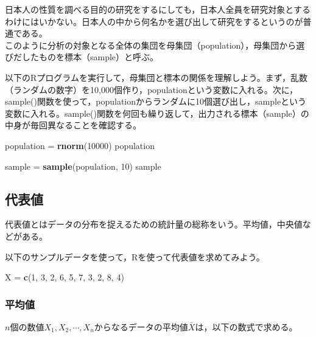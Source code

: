 \documentclass[]{article}
\newenvironment{Shaded}{\begin{snugshade}}{\end{snugshade}}
\newcommand{\KeywordTok}[1]{\textcolor[rgb]{0.13,0.29,0.53}{\textbf{#1}}}
\newcommand{\DecValTok}[1]{\textcolor[rgb]{0.00,0.00,0.81}{#1}}
\newcommand{\StringTok}[1]{\textcolor[rgb]{0.31,0.60,0.02}{#1}}
\newcommand{\NormalTok}[1]{#1}
\begin{document}
日本人の性質を調べる目的の研究をするにしても，日本人全員を研究対象とするわけにはいかない。日本人の中から何名かを選び出して研究をするというのが普通である。\\
このように分析の対象となる全体の集団を母集団（population），母集団から選びだしたものを標本（sample）と呼ぶ。

以下のRプログラムを実行して，母集団と標本の関係を理解しよう。まず，乱数（ランダムの数字）を10,000個作り，populationという変数に入れる。次に，sample()関数を使って，populationからランダムに10個選び出し，sampleという変数に入れる。sample()関数を何回も繰り返して，出力される標本（sample）の中身が毎回異なることを確認する。

\begin{Shaded}
\begin{Highlighting}[]
\NormalTok{population =}\StringTok{ }\KeywordTok{rnorm}\NormalTok{(}\DecValTok{10000}\NormalTok{)}
\NormalTok{population}

\NormalTok{sample =}\StringTok{ }\KeywordTok{sample}\NormalTok{(population, }\DecValTok{10}\NormalTok{)}
\NormalTok{sample}
\end{Highlighting}
\end{Shaded}

\subsection{代表値}

代表値とはデータの分布を捉えるための統計量の総称をいう。平均値，中央値などがある。

以下のサンプルデータを使って，Rを使って代表値を求めてみよう。

\begin{Shaded}
\begin{Highlighting}[]
\NormalTok{X =}\StringTok{ }\KeywordTok{c}\NormalTok{(}\DecValTok{1}\NormalTok{, }\DecValTok{3}\NormalTok{, }\DecValTok{2}\NormalTok{, }\DecValTok{6}\NormalTok{, }\DecValTok{5}\NormalTok{, }\DecValTok{7}\NormalTok{, }\DecValTok{3}\NormalTok{, }\DecValTok{2}\NormalTok{, }\DecValTok{8}\NormalTok{, }\DecValTok{4}\NormalTok{)}
\end{Highlighting}
\end{Shaded}

\subsubsection{平均値}

\(n\)個の数値\(X_{1}, X_{2}, \cdots, X_{n}\)からなるデータの平均値\(\bar{X}\)は，以下の数式で求める。
\end{document}
